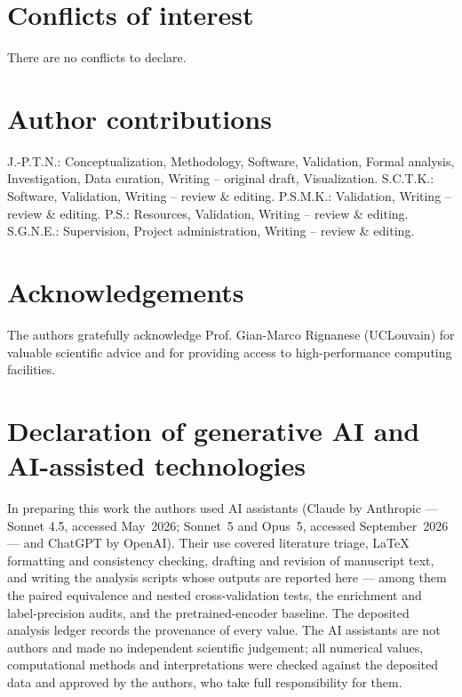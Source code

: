 \documentclass[twoside,onecolumn,9pt]{extarticle}
\begin{document}
\section*{Conflicts of interest}
There are no conflicts to declare.

\section*{Author contributions}
J.-P.T.N.: Conceptualization, Methodology, Software, Validation, Formal analysis, Investigation, Data curation, Writing -- original draft, Visualization.
S.C.T.K.: Software, Validation, Writing -- review \& editing.
P.S.M.K.: Validation, Writing -- review \& editing.
P.S.: Resources, Validation, Writing -- review \& editing.
S.G.N.E.: Supervision, Project administration, Writing -- review \& editing.

\section*{Acknowledgements}
The authors gratefully acknowledge Prof. Gian-Marco Rignanese (UCLouvain) for valuable scientific advice and
for providing access to high-performance computing facilities.

\section*{Declaration of generative AI and AI-assisted technologies}
In preparing this work the authors used AI assistants (Claude by Anthropic --- Sonnet
4.5, accessed May~2026; Sonnet~5 and Opus~5, accessed September~2026 --- and ChatGPT by
OpenAI). Their use covered literature triage, \LaTeX{} formatting and consistency
checking, drafting and revision of manuscript text, and writing the analysis scripts
whose outputs are reported here --- among them the paired equivalence and nested
cross-validation tests, the enrichment and label-precision audits, and the
pretrained-encoder baseline. The deposited analysis ledger records the provenance of
every value. The AI assistants are not authors and made no independent scientific
judgement; all numerical values, computational methods and interpretations were checked
against the deposited data and approved by the authors, who take full responsibility
for them.

\end{document}
